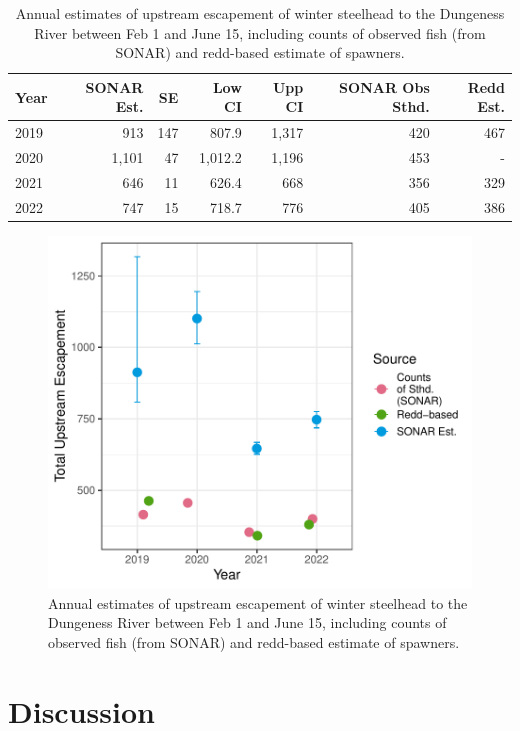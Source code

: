 \documentclass[
]{article}
\begin{document}
\begin{table}[!h]

\caption{\label{tab:redd-tab}Annual estimates of upstream escapement of winter steelhead to the Dungeness River between Feb 1 and June 15, including counts of observed fish (from SONAR) and redd-based estimate of spawners.}
\centering
\begin{tabular}[t]{lrrrrrr}
\toprule
Year & SONAR Est. & SE & Low CI & Upp CI & SONAR Obs Sthd. & Redd Est.\\
\midrule
2019 & 913 & 147 & 807.9 & 1,317 & 420 & 467\\
2020 & 1,101 & 47 & 1,012.2 & 1,196 & 453 & -\\
2021 & 646 & 11 & 626.4 & 668 & 356 & 329\\
2022 & 747 & 15 & 718.7 & 776 & 405 & 386\\
\bottomrule
\end{tabular}
\end{table}

\begin{figure}
\centering
\includegraphics{../figures/redd-fig-1.pdf}
\caption{\label{fig:redd-fig}Annual estimates of upstream escapement of winter steelhead to the Dungeness River between Feb 1 and June 15, including counts of observed fish (from SONAR) and redd-based estimate of spawners.}
\end{figure}

\FloatBarrier
\newpage

\hypertarget{discussion}{%
\section{Discussion}\label{discussion}}
\end{document}
